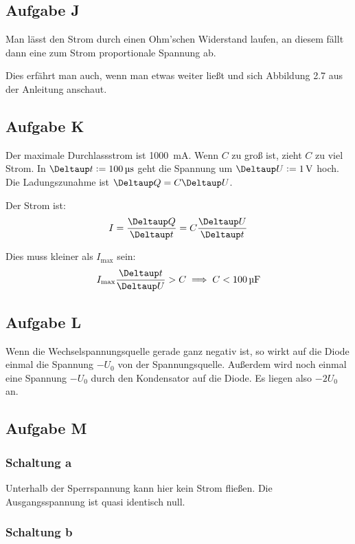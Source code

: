 \subsection{Aufgabe J}

Man lässt den Strom durch einen Ohm'schen Widerstand laufen, an diesem fällt
dann eine zum Strom proportionale Spannung ab.

Dies erfährt man auch, wenn man etwas weiter ließt und sich Abbildung 2.7 aus
der Anleitung anschaut.

\subsection{Aufgabe K}

Der maximale Durchlassstrom ist \SI{1000}{\milli\ampere}. Wenn $C$ zu groß ist,
zieht $C$ zu viel Strom. In $\Deltaup t := \SI{100}{\micro\second}$ geht die
Spannung um $\Deltaup U := \SI1\volt$ hoch. Die Ladungszunahme ist $\Deltaup Q
= C \Deltaup U$.

Der Strom ist:
\[
	I = \frac{\Deltaup Q}{\Deltaup t}
	= C \frac{\Deltaup U}{\Deltaup t}
\]

Dies muss kleiner als $I_\text{max}$ sein:
\[
	I_\text{max} \frac{\Deltaup t}{\Deltaup U} > C
	\implies
	C < \SI{100}{\micro\farad}
\]

\subsection{Aufgabe L}

Wenn die Wechselspannungsquelle gerade ganz negativ ist, so wirkt auf die Diode
einmal die Spannung $- U_0$ von der Spannungsquelle. Außerdem wird noch einmal
eine Spannung $-U_0$ durch den Kondensator auf die Diode. Es liegen also
$-2U_0$ an.

\subsection{Aufgabe M}

\subsubsection{Schaltung a}

Unterhalb der Sperrspannung kann hier kein Strom fließen. Die Ausgangsspannung
ist quasi identisch null.

\subsubsection{Schaltung b}

